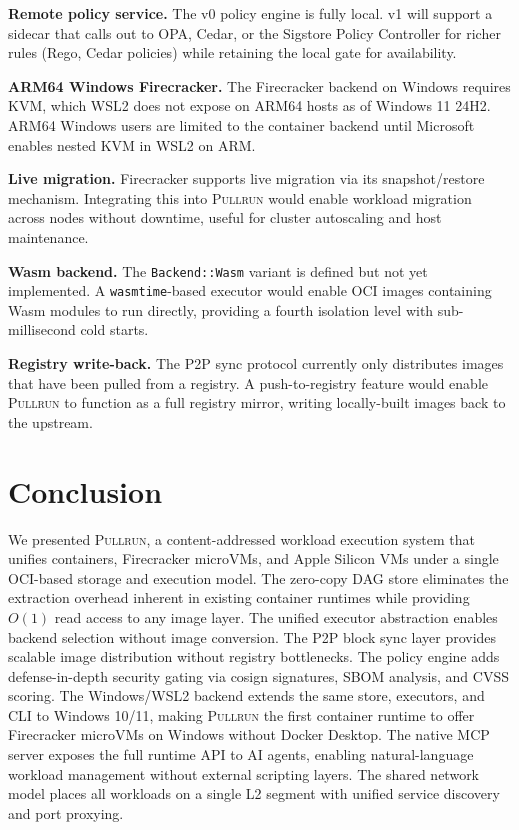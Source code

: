 \documentclass[11pt,a4paper]{article}
\newcommand{\pullrun}{\textsc{Pullrun}}
\begin{document}
\textbf{Remote policy service.} The v0 policy engine is fully local. v1 will support a sidecar that calls out to OPA, Cedar, or the Sigstore Policy Controller for richer rules (Rego, Cedar policies) while retaining the local gate for availability.

\textbf{ARM64 Windows Firecracker.} The Firecracker backend on Windows requires KVM, which WSL2 does not expose on ARM64 hosts as of Windows 11 24H2. ARM64 Windows users are limited to the container backend until Microsoft enables nested KVM in WSL2 on ARM.

\textbf{Live migration.} Firecracker supports live migration via its snapshot/restore mechanism. Integrating this into \pullrun{} would enable workload migration across nodes without downtime, useful for cluster autoscaling and host maintenance.

\textbf{Wasm backend.} The \texttt{Backend::Wasm} variant is defined but not yet implemented. A \texttt{wasmtime}-based executor would enable OCI images containing Wasm modules to run directly, providing a fourth isolation level with sub-millisecond cold starts.

\textbf{Registry write-back.} The P2P sync protocol currently only distributes images that have been pulled from a registry. A push-to-registry feature would enable \pullrun{} to function as a full registry mirror, writing locally-built images back to the upstream.

\section{Conclusion}\label{sec:conclusion}

We presented \pullrun{}, a content-addressed workload execution system that unifies containers, Firecracker microVMs, and Apple Silicon VMs under a single OCI-based storage and execution model. The zero-copy DAG store eliminates the extraction overhead inherent in existing container runtimes while providing $O(1)$ read access to any image layer. The unified executor abstraction enables backend selection without image conversion. The P2P block sync layer provides scalable image distribution without registry bottlenecks. The policy engine adds defense-in-depth security gating via cosign signatures, SBOM analysis, and CVSS scoring. The Windows/WSL2 backend extends the same store, executors, and CLI to Windows 10/11, making \pullrun{} the first container runtime to offer Firecracker microVMs on Windows without Docker Desktop. The native MCP server exposes the full runtime API to AI agents, enabling natural-language workload management without external scripting layers. The shared network model places all workloads on a single L2 segment with unified service discovery and port proxying.
\end{document}
